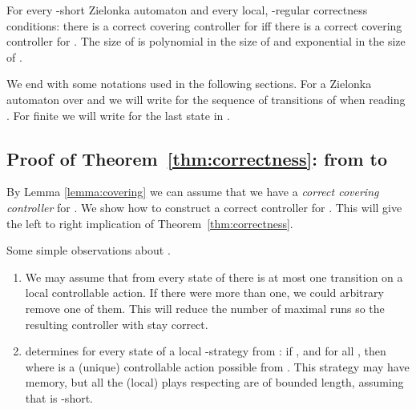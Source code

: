 \documentclass[10pt,a4paper]{article}
\begin{document}
\begin{theorem}\label{thm:correctness}
  For every -short Zielonka automaton  and every local,
  -regular
  correctness conditions: there is a correct covering controller for
   iff there is a correct covering controller for . 
  The size of  is polynomial in the size of  and
  exponential in the size of .
\end{theorem}

We end with some notations used in the following sections. For a
Zielonka automaton  over  and  we will write  for the sequence of transitions of  when
  reading . For finite  we will write  for the last state in
  .



























\subsection{Proof of Theorem~\ref{thm:correctness}: from 
                                to }\label{sec:C}

By Lemma \ref{lemma:covering} we can assume that we have a
\emph{correct covering controller}   for . We show how to construct
a correct controller  for . This will give the left
to right implication of Theorem~\ref{thm:correctness}.

\begin{remark} Some simple observations about .
\begin{enumerate}
\item We may assume that from every state of  there is at most one
  transition on a local controllable action. If there were more than
  one, we could arbitrary remove one of them. This will reduce
  the number of maximal runs so the resulting controller with stay correct.

\item  determines for every state  of  a local
  -strategy  from : if ,  and  for all
  , then  where  is a (unique)
  controllable action possible from . This strategy
  may have memory, but all the (local) plays respecting
   are of bounded length, assuming that  is -short.
\end{enumerate}
\end{remark}
\end{document}
